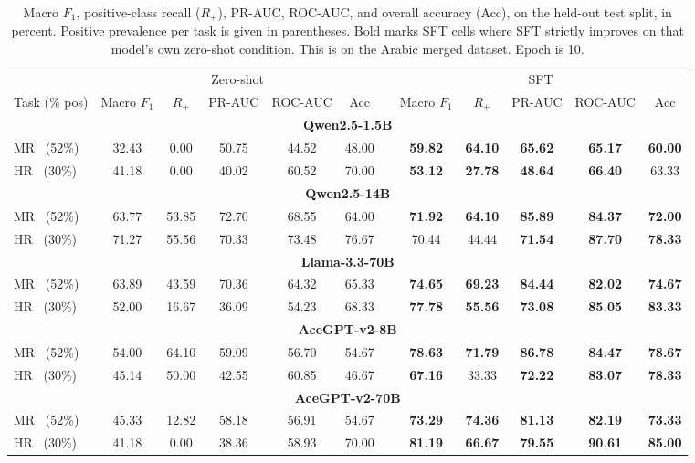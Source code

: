 \begin{table}[!htbp]
\centering
\caption{Macro $F_1$, positive-class recall ($R_{+}$), PR-AUC, ROC-AUC,
and overall accuracy (Acc), on the held-out test split, in percent. Positive prevalence
per task is given in parentheses. Bold marks SFT cells where
SFT strictly improves on that model's own zero-shot condition. This is on the Arabic merged dataset. Epoch is 10.}
\label{tab:llm-results-merged-ar-ep10}
\setlength{\tabcolsep}{5pt}
\small
\begin{tabular}{l ccccc c ccccc}
\toprule
 & \multicolumn{5}{c}{Zero-shot} & & \multicolumn{5}{c}{SFT} \\
\cmidrule(lr){2-6}\cmidrule(lr){8-12}
Task (\% pos)
 & Macro $F_1$ & $R_{+}$ & PR-AUC & ROC-AUC & Acc & & Macro $F_1$ & $R_{+}$ & PR-AUC & ROC-AUC & Acc \\
\midrule
\multicolumn{12}{c}{\textbf{Qwen2.5-1.5B}} \\
\midrule
MR \ (52\%) & 32.43 & 0.00 & 50.75 & 44.52 & 48.00 & & \textbf{59.82} & \textbf{64.10} & \textbf{65.62} & \textbf{65.17} & \textbf{60.00} \\
HR \ (30\%) & 41.18 & 0.00 & 40.02 & 60.52 & 70.00 & & \textbf{53.12} & \textbf{27.78} & \textbf{48.64} & \textbf{66.40} & 63.33 \\
\midrule
\midrule
\multicolumn{12}{c}{\textbf{Qwen2.5-14B}} \\
\midrule
MR \ (52\%) & 63.77 & 53.85 & 72.70 & 68.55 & 64.00 & & \textbf{71.92} & \textbf{64.10} & \textbf{85.89} & \textbf{84.37} & \textbf{72.00} \\
HR \ (30\%) & 71.27 & 55.56 & 70.33 & 73.48 & 76.67 & & 70.44 & 44.44 & \textbf{71.54} & \textbf{87.70} & \textbf{78.33} \\
\midrule
\midrule
\multicolumn{12}{c}{\textbf{Llama-3.3-70B}} \\
\midrule
MR \ (52\%) & 63.89 & 43.59 & 70.36 & 64.32 & 65.33 & & \textbf{74.65} & \textbf{69.23} & \textbf{84.44} & \textbf{82.02} & \textbf{74.67} \\
HR \ (30\%) & 52.00 & 16.67 & 36.09 & 54.23 & 68.33 & & \textbf{77.78} & \textbf{55.56} & \textbf{73.08} & \textbf{85.05} & \textbf{83.33} \\
\midrule
\midrule
\multicolumn{12}{c}{\textbf{AceGPT-v2-8B}} \\
\midrule
MR \ (52\%) & 54.00 & 64.10 & 59.09 & 56.70 & 54.67 & & \textbf{78.63} & \textbf{71.79} & \textbf{86.78} & \textbf{84.47} & \textbf{78.67} \\
HR \ (30\%) & 45.14 & 50.00 & 42.55 & 60.85 & 46.67 & & \textbf{67.16} & 33.33 & \textbf{72.22} & \textbf{83.07} & \textbf{78.33} \\
\midrule
\midrule
\multicolumn{12}{c}{\textbf{AceGPT-v2-70B}} \\
\midrule
MR \ (52\%) & 45.33 & 12.82 & 58.18 & 56.91 & 54.67 & & \textbf{73.29} & \textbf{74.36} & \textbf{81.13} & \textbf{82.19} & \textbf{73.33} \\
HR \ (30\%) & 41.18 & 0.00 & 38.36 & 58.93 & 70.00 & & \textbf{81.19} & \textbf{66.67} & \textbf{79.55} & \textbf{90.61} & \textbf{85.00} \\
\bottomrule
\end{tabular}
\end{table}

